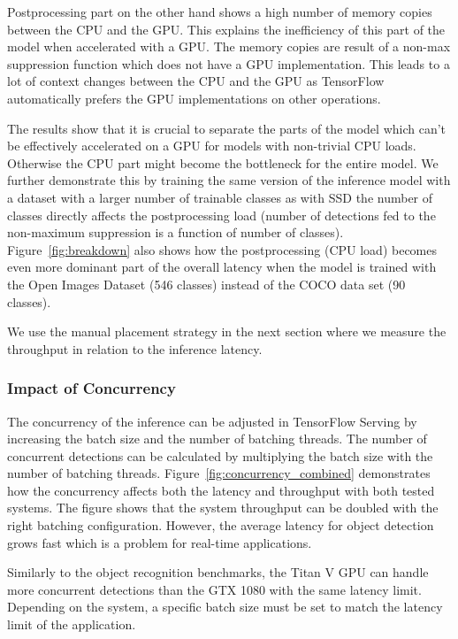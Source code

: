 \documentclass[sigconf]{acmart}
\begin{document}
Postprocessing part on the other hand shows a high number of memory copies between the CPU and the GPU. This explains the inefficiency of this part of the model when accelerated with a GPU. The memory copies are result of a non-max suppression function which does not have a GPU implementation. This leads to a lot of context changes between the CPU and the GPU as TensorFlow automatically prefers the GPU implementations on other operations.

The results show that it is crucial to separate the parts of the model which can't be effectively accelerated on a GPU for models with non-trivial CPU loads. Otherwise the CPU part might become the bottleneck for the entire model. We further demonstrate this by training the same version of the inference model with a dataset with a larger number of trainable classes as with SSD the number of classes directly affects the postprocessing load (number of detections fed to the non-maximum suppression is a function of number of classes). Figure~\ref{fig:breakdown} also shows how the postprocessing (CPU load) becomes even more dominant part of the overall latency when the model is trained with the Open Images Dataset (546 classes) instead of the COCO data set (90 classes).

We use the manual placement strategy in the next section where we measure the throughput in relation to the inference latency.

\subsubsection{Impact of Concurrency}

The concurrency of the inference can be adjusted in TensorFlow Serving by increasing the batch size and the number of batching threads. The number of concurrent detections can be calculated by multiplying the batch size with the number of batching threads. Figure~\ref{fig:concurrency_combined} demonstrates how the concurrency affects both the latency and throughput with both tested systems. The figure shows that the system throughput can be doubled with the right batching configuration. However, the average latency for object detection grows fast which is a problem for real-time applications.

Similarly to the object recognition benchmarks, the Titan V GPU can handle more concurrent detections than the GTX 1080 with the same latency limit. Depending on the system, a specific batch size must be set to match the latency limit of the application.
\end{document}
